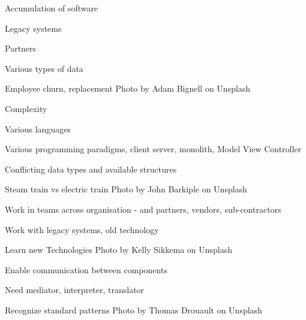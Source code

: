 \documentclass[Screen16to9,17pt]{foils}
\begin{document}


\begin{list2}
\item Accumulation of software
\item Legacy systems
\item Partners
\item Various types of data
\item Employee churn, replacement \hfill Photo by Adam Bignell on Unsplash
\end{list2}




\begin{list2}
\item Complexity
\item Various languages
\item Various programming paradigms, client server, monolith, Model View Controller
\item Conflicting data types and available structures
\item Steam train vs electric train \hfill Photo by John Barkiple on Unsplash

\end{list2}






\begin{list2}
\item Work in teams across organisation - and partners, vendors, sub-contractors
\item Work with legacy systems, old technology
\item Learn new Technologies \hfill Photo by Kelly Sikkema on Unsplash
\end{list2}







\begin{list2}
\item Enable communication between components
\item Need mediator, interpreter, translator
\item Recognize standard patterns \hfill Photo by Thomas Drouault on Unsplash
\end{list2}
\end{document}

